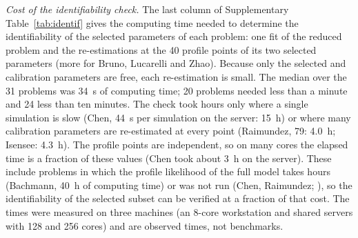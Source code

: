 \emph{Cost of the identifiability check.} The last column of Supplementary Table~\ref{tab:identif} gives the computing time needed to determine the identifiability of the selected parameters of each problem: one fit of the reduced problem and the re-estimations at the 40 profile points of its two selected parameters (more for Bruno, Lucarelli and Zhao). Because only the selected and calibration parameters are free, each re-estimation is small. The median over the 31 problems was 34~s of computing time; 20 problems needed less than a minute and 24 less than ten minutes. The check took hours only where a single simulation is slow (Chen, 44~s per simulation on the server: 15~h) or where many calibration parameters are re-estimated at every point (Raimundez, 79: 4.0~h; Isensee: 4.3~h). The profile points are independent, so on many cores the elapsed time is a fraction of these values (Chen took about 3~h on the server). These include problems in which the profile likelihood of the full model takes hours (Bachmann, 40~h of computing time) or was not run (Chen, Raimundez; ), so the identifiability of the selected subset can be verified at a fraction of that cost. The times were measured on three machines (an 8-core workstation and shared servers with 128 and 256 cores) and are observed times, not benchmarks.

